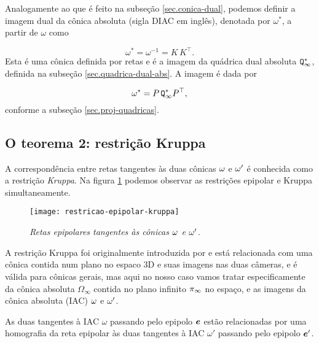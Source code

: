 Analogamente ao que é feito na subseção \ref{sec.conica-dual}, podemos definir a imagem dual da cônica absoluta (sigla DIAC em inglês), denotada por $\omega^*$, a partir de $\omega$ como

\begin{equation*}
\omega^*=\omega^{-1}=K\,K^\top.
\end{equation*}
Esta é uma cônica definida por retas e é a imagem da quádrica dual absoluta ${\tt Q^*_\infty}$, definida na subseção \ref{sec.quadrica-dual-abs}. A imagem é dada por

\begin{equation*}
\omega^*=P\,{\tt Q^*_\infty}P^\top,
\end{equation*}
conforme a subseção \ref{sec.proj-quadricas}.\\

\subsection{O teorema 2: restrição Kruppa}\label{sec.teorema-2}

A correspondência entre retas tangentes às duas cônicas ${\bf \omega}$ e ${\bf \omega'}$ é conhecida como a restrição \textit{Kruppa}. Na figura \ref{epipolar-kruppa} podemos observar as restrições epipolar e Kruppa simultaneamente.

\begin{figure}[!htb]
\centering
\texttt{[image: restricao-epipolar-kruppa]}
\caption{\textit{Retas epipolares tangentes às cônicas ${\bf \omega}$ e ${\bf \omega'}$.}}
\label{epipolar-kruppa}
\end{figure}

A restrição Kruppa foi originalmente introduzida por \cite{faugeras92} e está relacionada com uma cônica contida num plano no espaco 3D e suas imagens nas duas câmeras, e é válida para cônicas gerais, mas aqui no nosso caso vamos tratar especificamente da cônica absoluta $\Omega_\infty$ contida no plano infinito $\pi_\infty$ no espaço, e as imagens da cônica absoluta (IAC) ${\bf \omega}$ e ${\bf \omega'}$.

\begin{teorema}
As duas tangentes à IAC $\omega$ passando pelo epipolo $\boldsymbol{e}$ estão relacionadas por uma homografia da reta epipolar às duas tangentes à IAC $\omega'$ passando pelo epipolo $\boldsymbol{e}'$.
\end{teorema}

